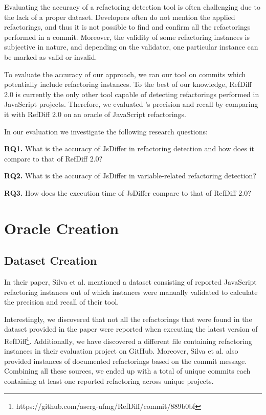 \documentclass[letterpaper,12pt,onecolumn,final]{report}
\begin{document}
Evaluating the accuracy of a refactoring detection tool is often challenging due to the lack of a proper dataset. Developers often do not mention the applied refactorings, and thus it is not possible to find and confirm all the refactorings performed in a commit. Moreover, the validity of some refactoring instances is subjective in nature, and depending on the validator, one particular instance can be marked as valid or invalid.

To evaluate the accuracy of our approach, we ran our tool on \evTotalCommits{} commits which potentially include refactoring instances. To the best of our knowledge, RefDiff 2.0 \cite{Silva2020} is currently the only other tool capable of detecting refactorings performed in JavaScript projects. Therefore, we evaluated \toolname{}'s precision and recall by comparing it with RefDiff 2.0 on an oracle of \oracleValidatedInstances{} JavaScript refactorings.

In our evaluation we investigate the following research questions:

\textbf{RQ1.} What is the accuracy of JsDiffer in refactoring detection and how does it compare to that of RefDiff 2.0?

\textbf{RQ2.} What is the accuracy of JsDiffer in variable-related refactoring detection?

\textbf{RQ3.} How does the execution time of JsDiffer compare to that of RefDiff 2.0?

\section {Oracle Creation}

\subsection {Dataset Creation}
In their paper, Silva et al. \cite{Silva2020} mentioned a dataset consisting of \evRefDiffReportedCount{} reported JavaScript refactoring instances out of which \evRefDiffValidatedCount{} instances were manually validated to calculate the precision and recall of their tool.

Interestingly, we discovered that not all the refactorings that were found in the dataset provided in the paper were reported when executing the latest version of RefDiff\footnote{https://github.com/aserg-ufmg/RefDiff/commit/889b0bf}. Additionally, we have discovered a different file containing \evRefDiffJsDataCsvCount{} refactoring instances in their evaluation project on GitHub. Moreover, Silva et al. also provided  \evRefDiffDocumentedCount{} instances of documented refactorings based on the commit message. Combining all these sources, we ended up with a total of \evTotalCommits{} unique commits each containing at least one reported refactoring across \evTotalProjectCounts{} unique projects.
\end{document}
